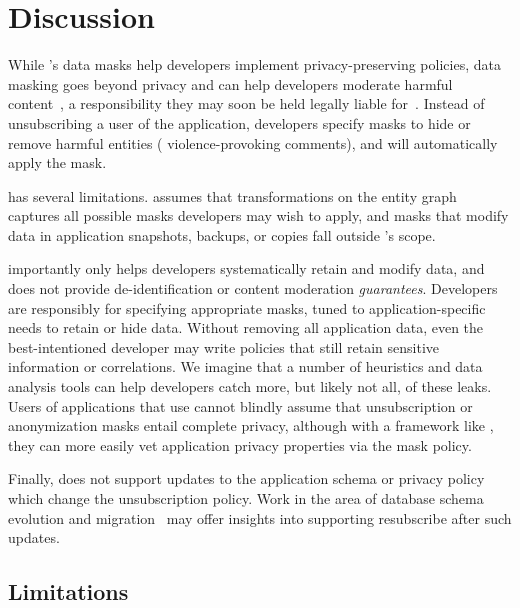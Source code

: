 \section{Discussion}
While \name's data masks help developers implement privacy-preserving policies, data masking goes
beyond privacy and can help developers moderate harmful content~\cite{contentmod,
sasb}, a responsibility they may soon be held legally liable for~\cite{nytimes:230}. Instead of
unsubscribing a user of the application, developers specify masks to hide or remove harmful entities (\eg
violence-provoking comments), and \name will automatically apply the mask.

\name has several limitations. \name assumes that transformations on the entity graph captures all possible masks developers may
wish to apply, and masks that modify data in application snapshots, backups, or copies fall outside
\name's scope.

\name importantly only helps developers systematically retain and modify data, and does not provide
de-identification or content moderation \emph{guarantees}. Developers are responsibly for specifying
appropriate masks, tuned to application-specific needs to retain or hide data. Without removing all
application data, even the best-intentioned developer may write policies that still retain
sensitive information or correlations. We imagine that a number of heuristics and data analysis
tools can help developers catch more, but likely not all, of these leaks. Users of applications that
use \sys cannot blindly assume that unsubscription or anonymization masks entail complete privacy,
although with a framework like \sys, they can more easily vet application privacy properties via the  
mask policy.

Finally, \sys does not support updates to the application schema or privacy policy which change the
unsubscription policy.
Work in the area of database schema evolution and migration~\cite{schema:evo} may offer insights
into supporting resubscribe after such updates.

\iffalse
\subsection{Limitations}

